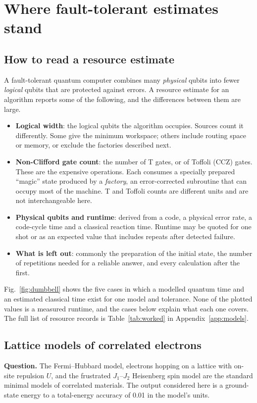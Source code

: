 \section{Where fault-tolerant estimates stand}
\label{sec:ft}

\subsection{How to read a resource estimate}
A fault-tolerant quantum computer combines many \emph{physical} qubits into fewer \emph{logical} qubits that are protected against errors. A resource estimate for an algorithm reports some of the following, and the differences between them are large.
\begin{itemize}
\item \textbf{Logical width}: the logical qubits the algorithm occupies. Sources count it differently. Some give the minimum workspace; others include routing space or memory, or exclude the factories described next.
\item \textbf{Non-Clifford gate count}: the number of T gates, or of Toffoli (CCZ) gates. These are the expensive operations. Each consumes a specially prepared ``magic'' state produced by a \emph{factory}, an error-corrected subroutine that can occupy most of the machine. T and Toffoli counts are different units and are not interchangeable here.
\item \textbf{Physical qubits and runtime}: derived from a code, a physical error rate, a code-cycle time and a classical reaction time. Runtime may be quoted for one shot or as an expected value that includes repeats after detected failure.
\item \textbf{What is left out}: commonly the preparation of the initial state, the number of repetitions needed for a reliable answer, and every calculation after the first.
\end{itemize}
Fig.~\ref{fig:dumbbell} shows the five cases in which a modelled quantum time and an estimated classical time exist for one model and tolerance. None of the plotted values is a measured runtime, and the cases below explain what each one covers. The full list of resource records is Table~\ref{tab:worked} in Appendix~\ref{app:models}.



\subsection{Lattice models of correlated electrons}
\label{sec:lattice}
\textbf{Question.} The Fermi--Hubbard model, electrons hopping on a lattice with on-site repulsion $U$, and the frustrated $J_1$--$J_2$ Heisenberg spin model are the standard minimal models of correlated materials. The output considered here is a ground-state energy to a total-energy accuracy of 0.01 in the model's units.

